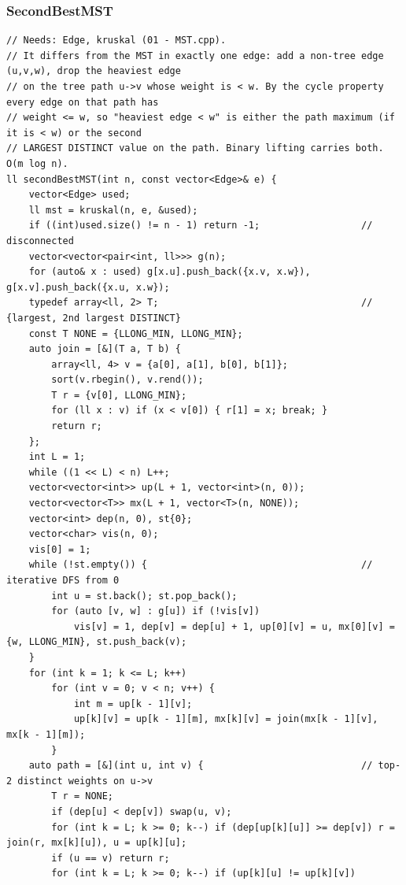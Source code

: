 \documentclass[9pt,a4paper,twocolumn]{extarticle}
\begin{document}
\subsubsection{SecondBestMST}
\nopagebreak
\begin{lstlisting}
// Needs: Edge, kruskal (01 - MST.cpp).
// It differs from the MST in exactly one edge: add a non-tree edge (u,v,w), drop the heaviest edge
// on the tree path u->v whose weight is < w. By the cycle property every edge on that path has
// weight <= w, so "heaviest edge < w" is either the path maximum (if it is < w) or the second
// LARGEST DISTINCT value on the path. Binary lifting carries both. O(m log n).
ll secondBestMST(int n, const vector<Edge>& e) {
    vector<Edge> used;
    ll mst = kruskal(n, e, &used);
    if ((int)used.size() != n - 1) return -1;                  // disconnected
    vector<vector<pair<int, ll>>> g(n);
    for (auto& x : used) g[x.u].push_back({x.v, x.w}), g[x.v].push_back({x.u, x.w});
    typedef array<ll, 2> T;                                    // {largest, 2nd largest DISTINCT}
    const T NONE = {LLONG_MIN, LLONG_MIN};
    auto join = [&](T a, T b) {
        array<ll, 4> v = {a[0], a[1], b[0], b[1]};
        sort(v.rbegin(), v.rend());
        T r = {v[0], LLONG_MIN};
        for (ll x : v) if (x < v[0]) { r[1] = x; break; }
        return r;
    };
    int L = 1;
    while ((1 << L) < n) L++;
    vector<vector<int>> up(L + 1, vector<int>(n, 0));
    vector<vector<T>> mx(L + 1, vector<T>(n, NONE));
    vector<int> dep(n, 0), st{0};
    vector<char> vis(n, 0);
    vis[0] = 1;
    while (!st.empty()) {                                      // iterative DFS from 0
        int u = st.back(); st.pop_back();
        for (auto [v, w] : g[u]) if (!vis[v])
            vis[v] = 1, dep[v] = dep[u] + 1, up[0][v] = u, mx[0][v] = {w, LLONG_MIN}, st.push_back(v);
    }
    for (int k = 1; k <= L; k++)
        for (int v = 0; v < n; v++) {
            int m = up[k - 1][v];
            up[k][v] = up[k - 1][m], mx[k][v] = join(mx[k - 1][v], mx[k - 1][m]);
        }
    auto path = [&](int u, int v) {                            // top-2 distinct weights on u->v
        T r = NONE;
        if (dep[u] < dep[v]) swap(u, v);
        for (int k = L; k >= 0; k--) if (dep[up[k][u]] >= dep[v]) r = join(r, mx[k][u]), u = up[k][u];
        if (u == v) return r;
        for (int k = L; k >= 0; k--) if (up[k][u] != up[k][v])

\end{lstlisting}
\end{document}
